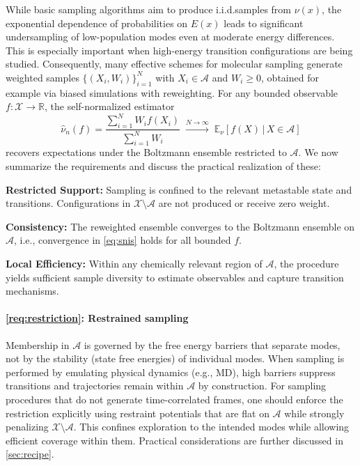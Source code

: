 \documentclass[]{fairmeta}
\theoremstyle{remark}
\begin{document}
While basic sampling algorithms aim to produce i.i.d.\@ samples from $\nu(x)$, the exponential dependence of probabilities on $E(x)$ leads to significant undersampling of low-population modes even at moderate energy differences.
This is especially important when high-energy transition configurations are being studied.
Consequently, many effective schemes for molecular sampling generate weighted samples $\{(X_i, W_i)\}_{i=1}^N$ with $X_i \in \mathcal{A}$ and $W_i \ge 0$, obtained for example via biased simulations with reweighting.
For any bounded observable $f: \mathcal{X} \to \mathbb{R}$, the self-normalized estimator
\begin{equation}
\hat{\nu}_n(f) = \frac{\sum_{i=1}^N W_i f(X_i)}{\sum_{i=1}^N W_i} \; \xrightarrow{N \to \infty} \; \mathbb{E}_\nu[f(X) \, | \, X \in \mathcal{A}]
\label{eq:snis}
\end{equation}
recovers expectations under the Boltzmann ensemble restricted to $\mathcal{A}$.
We now summarize the requirements and discuss the practical realization of these:
\begin{highlightbox}
\begin{reqenum}[leftmargin=*,itemsep=.2cm]
\item \label{req:restriction} \textbf{Restricted Support:} Sampling is confined to the relevant metastable state and transitions. Configurations in $\mathcal{X} \setminus \mathcal{A}$ are not produced or receive zero weight.
\item \label{req:consistency} \textbf{Consistency:} The reweighted ensemble converges to the Boltzmann ensemble on $\mathcal{A}$, i.e., convergence in \cref{eq:snis} holds for all bounded $f$.
\item \label{req:efficiency} \textbf{Local Efficiency:} Within any chemically relevant region of $\mathcal{A}$, the procedure yields sufficient sample diversity to estimate observables and capture transition mechanisms.
\end{reqenum}
\end{highlightbox}

\paragraph{\cref{req:restriction}: Restrained sampling}
Membership in $\mathcal{A}$ is governed by the free energy barriers that separate modes, not by the stability (state free energies) of individual modes.
When sampling is performed by emulating physical dynamics (e.g., MD), high barriers suppress transitions and trajectories remain within $\mathcal{A}$ by construction.
For sampling procedures that do not generate time-correlated frames, one should enforce the restriction explicitly using restraint potentials that are flat on $\mathcal{A}$ while strongly penalizing $\mathcal{X} \setminus \mathcal{A}$.
This confines exploration to the intended modes while allowing efficient coverage within them.
Practical considerations are further discussed in \cref{sec:recipe}.
\end{document}

